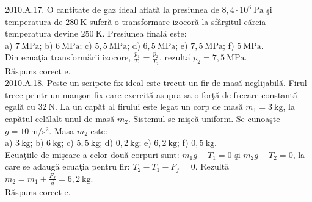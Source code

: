 2010.A.17. O cantitate de gaz ideal aflată la presiunea de $8,4 \cdot 10^{6} \mathrm{~Pa}$ şi temperatura de $280 \mathrm{~K}$ suferă o transformare izocoră la sfârşitul căreia temperatura devine $250 \mathrm{~K}$. Presiunea finală este:\\ a) $7 \mathrm{~MPa}$; b) $6 \mathrm{~MPa}$; c) $5,5 \mathrm{~MPa}$; d) $6,5 \mathrm{~MPa}$; e) $7,5 \mathrm{~MPa}$; f) $5 \mathrm{~MPa}$.\\ Din ecuaţia transformării izocore, $\frac{p_{1}}{T_{1}}=\frac{p_{2}}{T_{2}}$, rezultă $p_{2}=7,5 \mathrm{~MPa}$.\\ Răspuns corect e.\\

2010.A.18. Peste un scripete fix ideal este trecut un fir de masă neglijabilă. Firul trece printr-un manşon fix care exercită asupra sa o forţă de frecare constantă egală cu $32 \mathrm{~N}$. La un capăt al firului este legat un corp de masă $m_{1}=3 \mathrm{~kg}$, la capătul celălalt unul de masă $m_{2}$. Sistemul se mişcă uniform. Se cunoaşte $g=10 \mathrm{~m} / \mathrm{s}^{2}$. Masa $m_{2}$ este:\\ a) $3 \mathrm{~kg}$; b) $6 \mathrm{~kg}$; c) $5,5 \mathrm{~kg}$; d) $0,2 \mathrm{~kg}$; e) $6,2 \mathrm{~kg}$; f) $0,5 \mathrm{~kg}$.\\ Ecuaţiile de mişcare a celor două corpuri sunt: $m_{1} g-T_{1}=0$ şi $m_{2} g-T_{2}=0$, la care se adaugă ecuaţia pentru fir: $T_{2}-T_{1}-F_{f}=0$. Rezultă $m_{2}=m_{1}+\frac{F_{f}}{g}=6,2 \mathrm{~kg}$.\\ Răspuns corect e.\\
